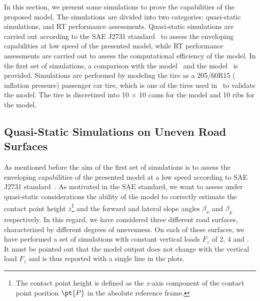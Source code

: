 In this section, we present some simulations to prove the capabilities of the proposed model. The simulations are divided into two categories: quasi-static simulations, and \ac{RT} performance assessments. Quasi-static simulations are carried out according to the SAE J2731 standard~\cite{saej2731} to assess the enveloping capabilities at low speed of the presented model,
while \ac{RT} performance assessments are carried out to assess the computational efficiency of the model.
In
the first set of
simulations, a comparison with the \Swift{} model~\cite{schmeitz2004semiempirical} and the \TMEasy{} model~\cite{rill2018sophisticated} is provided. Simulations are performed by modeling the tire as a 205/60R15 ( inflation pressure) passenger car tire, which is one of the tires used in~\cite{schmeitz2004semiempirical} to validate the \Swift{} model. The tire is discretized into 10 $\times$ 10 cams for the \Swift{} model and 10 ribs for the \Enve{} model.

\subsection{Quasi-Static Simulations on Uneven Road Surfaces}
\label{app2:sec:enveloping}

As mentioned before the aim of the first set of simulations is to assess the enveloping capabilities of the presented model at a low speed according to SAE J2731 standard~\cite{saej2731}. As motivated in the SAE standard, we want to assess under quasi-static considerations the ability of the model to correctly estimate the contact point height $z$\footnote{The contact point height is defined as the $z$-axis component of the contact point position $\pt{P}$ in the absolute reference frame.} and the forward and lateral slope angles $\beta_x$ and $\beta_y$ respectively. In this regard, we have considered three different road surfaces, characterized by different degrees of unevenness. On each of these surfaces, we have performed a set of simulations with constant vertical loads $F_z$ of 2, 4 and . It must be pointed out that the \TMEasy{} model output does not change with the vertical load $F_z$ and is thus reported with a single line in the plots.

